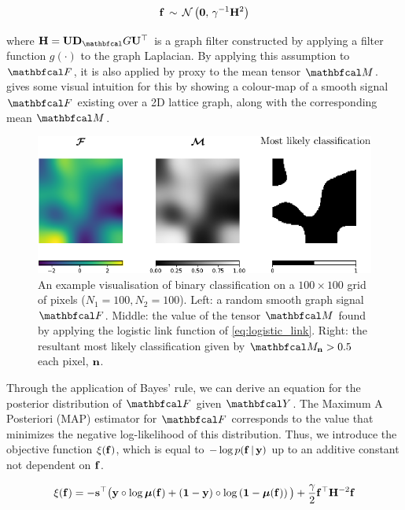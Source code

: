 \begin{equation}
    \mathbf{f}  \, \sim \, \mathcal{N}\left( \mathbf{0}, \, \gamma^{-1} \mathbf{H}^2 \right) 
\end{equation}

where $\HH = \U \D_\Gt \U^\top$ is a graph filter constructed by applying a filter function $g(\cdot)$ to the graph Laplacian. By applying this assumption to $\Ft$, it is also applied by proxy to the mean tensor $\Mt$.  gives some visual intuition for this by showing a colour-map of a smooth signal $\Ft$ existing over a 2D lattice graph, along with the corresponding mean $\Mt$. 

\begin{figure}[t] 
    \begin{center}
        \includegraphics[width=0.9
        \linewidth]{Figures/logistic_gsr.pdf}
    \end{center}
    \caption[Visualisation of binary classification on a 2D lattice]{An example visualisation of binary classification on a $100 \times 100$ grid of pixels ($N_1 = 100, N_2 = 100$). Left: a random smooth graph signal $\Ft$. Middle: the value of the tensor $\Mt$ found by applying the logistic link function of \cref{eq:logistic_link}. Right: the resultant most likely classification given by $\Mt_{\nn} > 0.5$ each pixel, $\mathbf{n}$.} 
    \label{fig:logistic_gsr}
\end{figure} 
 
Through the application of Bayes' rule, we can derive an equation for the posterior distribution of $\Ft$ given $\Yt$. The Maximum A Posteriori (MAP) estimator for $\Ft$ corresponds to the value that minimizes the negative log-likelihood of this distribution. Thus, we introduce the objective function $\xi(\mathbf{f}) $, which is equal to $ -\log p(\mathbf{f} \, | \, \mathbf{y})$ up to an additive constant not dependent on $\mathbf{f}$.
 
\begin{equation}
    \xi(\mathbf{f}) = -\mathbf{s}^\top \big(\mathbf{y} \circ \log \boldsymbol{\mu}(\mathbf{f}) + \left(\mathbf{1}  - \mathbf{y}\right) \circ \log \left(\mathbf{1} - \boldsymbol{\mu}(\mathbf{f}) \right)\big) + \frac{\gamma}{2} \mathbf{f}^\top \mathbf{H}^{-2} \mathbf{f}
\end{equation}

